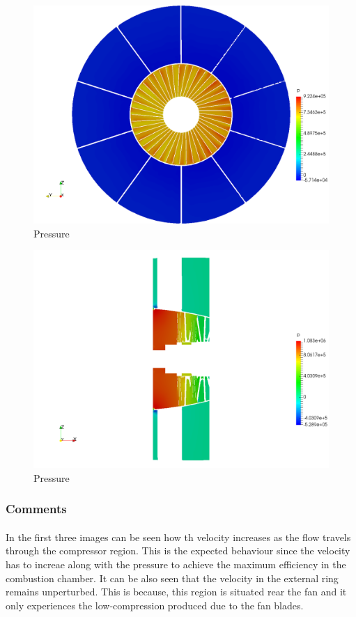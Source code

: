 \begin{figure}[h!]
\centering
\includegraphics[scale=0.28]{./img/screenshoots/p1.png}
\caption{Pressure}
\label{p1}
\end{figure}

\begin{figure}[h!]
\centering
\includegraphics[scale=0.28]{./img/screenshoots/p2.png}
\caption{Pressure}
\label{p2}
\end{figure}

\newpage\subsubsection{Comments}

\paragraph{}In the first three images can be seen how th velocity increases as the flow travels through the compressor region. This is the expected behaviour since the velocity has to increae along with the pressure to achieve the maximum efficiency in the combustion chamber. It can be also seen that the velocity in the external ring remains unperturbed. This is because, this region is situated rear the fan and it only experiences the low-compression produced due to the fan blades.

